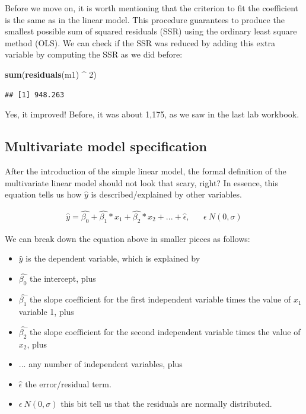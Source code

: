 \documentclass[
]{book}
\newenvironment{Shaded}{\begin{snugshade}}{\end{snugshade}}
\newcommand{\DecValTok}[1]{\textcolor[rgb]{0.00,0.00,0.81}{#1}}
\newcommand{\FunctionTok}[1]{\textcolor[rgb]{0.13,0.29,0.53}{\textbf{#1}}}
\newcommand{\NormalTok}[1]{#1}
\newcommand{\SpecialCharTok}[1]{\textcolor[rgb]{0.81,0.36,0.00}{\textbf{#1}}}
\providecommand{\tightlist}{%
  \setlength{\itemsep}{0pt}\setlength{\parskip}{0pt}}
\begin{document}
Before we move on, it is worth mentioning that the criterion to fit the coefficient is the same as in the linear model. This procedure guarantees to produce the smallest possible sum of squared residuals (SSR) using the ordinary least square method (OLS). We can check if the SSR was reduced by adding this extra variable by computing the SSR as we did before:

\begin{Shaded}
\begin{Highlighting}[]
\FunctionTok{sum}\NormalTok{(}\FunctionTok{residuals}\NormalTok{(m1) }\SpecialCharTok{\^{}} \DecValTok{2}\NormalTok{)}
\end{Highlighting}
\end{Shaded}

\begin{verbatim}
## [1] 948.263
\end{verbatim}

Yes, it improved! Before, it was about 1,175, as we saw in the last lab workbook.

\hypertarget{multivariate-model-specification}{%
\subsection{Multivariate model specification}\label{multivariate-model-specification}}

After the introduction of the simple linear model, the formal definition of the multivariate linear model should not look that scary, right? In essence, this equation tells us how \(\hat{y}\) is described/explained by other variables.

\[
\begin{aligned}
\hat{y} = \hat{\beta_0} + \hat{\beta_1}*x_1 + \hat{\beta_2}*x_2 + ... +  \hat{\epsilon}, && \epsilon ~ N(0, \sigma)  
\end{aligned}
\]

We can break down the equation above in smaller pieces as follows:

\begin{itemize}
\tightlist
\item
  \(\hat{y}\) is the dependent variable, which is explained by
\item
  \(\hat{\beta_0}\) the intercept, plus
\item
  \(\hat{\beta_1}\) the slope coefficient for the first independent variable times the value of \(x_1\) variable 1, plus
\item
  \(\hat{\beta_2}\) the slope coefficient for the second independent variable times the value of \(x_2\), plus
\item
  \(...\) any number of independent variables, plus
\item
  \(\hat{\epsilon}\) the error/residual term.
\item
  \(\epsilon ~ N(0, \sigma)\) this bit tell us that the residuals are normally distributed.
\end{itemize}
\end{document}
